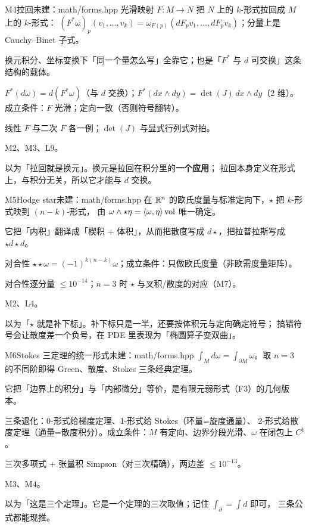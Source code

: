 \begin{know}{M4}{拉回}{未建：math/forms.hpp}
 光滑映射 $F:M\to N$ 把 $N$ 上的 $k$-形式拉回成 $M$ 上的 $k$-形式：
$(F^{*}\omega)_p(v_1,\dots,v_k)=\omega_{F(p)}(dF_pv_1,\dots,dF_pv_k)$；分量上是 Cauchy--Binet 子式。

 换元积分、坐标变换下「同一个量怎么写」全靠它；也是「$F^{*}$ 与 $d$ 可交换」这条结构的载体。

 $F^{*}(d\omega)=d(F^{*}\omega)$（与 $d$ 交换）；$F^{*}(dx\wedge dy)=\det(J)\,dx\wedge dy$（2 维）。
成立条件：$F$ 光滑；定向一致（否则符号翻转）。

 线性 $F$ 与二次 $F$ 各一例；$\det(J)$ 与显式行列式对拍。

 M2、M3、L9。

 以为「拉回就是换元」。换元是拉回在积分里的\textbf{一个应用}；
拉回本身定义在形式上，与积分无关，所以它才能与 $d$ 交换。
\end{know}

\begin{know}{M5}{Hodge star}{未建：math/forms.hpp}
 在 $\mathbb{R}^{n}$ 的欧氏度量与标准定向下，$\star$ 把 $k$-形式映到 $(n-k)$-形式，
由 $\omega\wedge\star\eta=\langle \omega,\eta\rangle\,\mathrm{vol}$ 唯一确定。

 它把「内积」翻译成「楔积 + 体积」，从而把散度写成 $d\star$，把拉普拉斯写成 $\star d\star d$。

 对合性 $\star\star\omega=(-1)^{k(n-k)}\omega$；成立条件：只做欧氏度量（非欧需度量矩阵）。

 对合性逐分量 $\le10^{-14}$；$n=3$ 时 $\star$ 与叉积/散度的对应（M7）。

 M2、L4。

 以为「$\star$ 就是补下标」。补下标只是一半，还要按体积元与定向确定符号；
搞错符号会让散度差一个负号，在 PDE 里表现为「椭圆算子变双曲」。
\end{know}

\begin{know}{M6}{Stokes 三定理的统一形式}{未建：math/forms.hpp}
 $\int_M d\omega=\int_{\partial M}\omega$。取 $n=3$ 的不同阶即得 Green、散度、Stokes 三条经典定理。

 它把「边界上的积分」与「内部微分」等价，是有限元弱形式（F3）的几何版本。

 三条退化：0-形式给梯度定理、1-形式给 Stokes（环量=旋度通量）、
2-形式给散度定理（通量=散度积分）。成立条件：$M$ 有定向、边界分段光滑、$\omega$ 在闭包上 $C^{1}$。

 三次多项式 + 张量积 Simpson（对三次精确），两边差 $\le10^{-13}$。

 M3、M4。

 以为「这是三个定理」。它是一个定理的三次取值；记住 $\int_{\partial}=\int d$ 即可，
三条公式都能现推。
\end{know}

